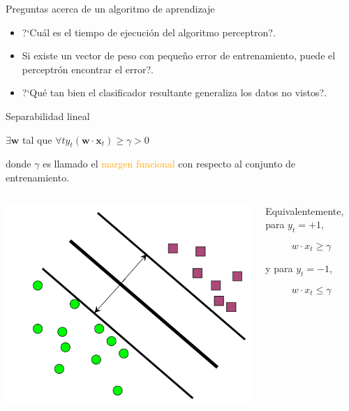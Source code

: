 \documentclass[11pt]{beamer}
\begin{document}
\begin{frame}{Preguntas acerca de un algoritmo de aprendizaje}
\begin{itemize}
	\item ?`Cu\'al es el tiempo de ejecuci\'on del algoritmo perceptron?.
	
	\item Si existe un vector de peso con peque\~no error de entrenamiento, puede el perceptr\'on encontrar el error?.
	
	\item  ?`Qu\'e tan bien el clasificador resultante generaliza los datos no vistos?.
\end{itemize}

\vspace{2.0cm}

\end{frame}
\begin{frame}{Separabilidad lineal}
\small{ 
$\exists \mathbf{w}$ tal que $\forall t$\qquad $y_t(\mathbf{w}\cdot \mathbf{x}_t) \geq \gamma >  0$

donde $\gamma$ es llamado el \textcolor{orange}{margen funcional} con respecto al conjunto de entrenamiento.
	
}

\vspace{0.5cm}

\begin{columns}
	\begin{column}{0.6\textwidth}
		\includegraphics[scale= 0.28]{TA8.png}	
	\end{column}
	\begin{column}{0.4\textwidth}  
\small{
	Equivalentemente, para $y_t = +1$,
	
	\[
	w\cdot x_t \geq \gamma
	\]
	
	y para $y_t = -1$,
	
		\[
		w\cdot x_t \leq \gamma
		\]
	
	
}
	\end{column}
\end{columns}
\end{frame}
\end{document}

